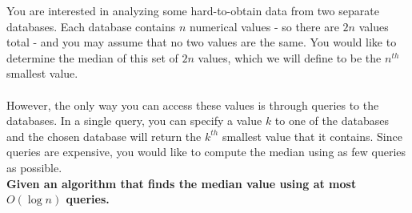 \documentclass[10pt,letter,notitlepage]{article}
\newcounter{exercise}
\begin{document}
\begin{exercise}[(15 marks)]
You are interested in analyzing some hard-to-obtain data from two separate databases. Each database contains $n$ numerical values - so there are $2n$ values total - and you may assume that no two values are the same. You would like to determine the median of this set of $2n$ values, which we will define to be the $n^{th}$ smallest value. \\\\
However, the only way you can access these values is through queries to the databases. In a single query, you can specify a value $k$ to one of the databases and the chosen database will return the $k^{th}$ smallest value that it contains. Since queries are expensive, you would like to compute the median using as few queries as possible. \\

\noindent
\textbf{Given an algorithm that finds the median value using at most $O(\log n)$ queries.}
	
\end{exercise}
\end{document}
